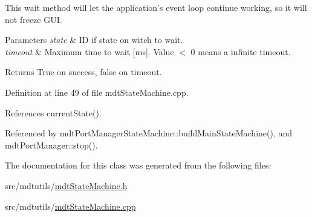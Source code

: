 This wait method will let the application's event loop continue working, so it will not freeze G\-U\-I.


\begin{DoxyParams}{Parameters}
{\em state} & I\-D if state on witch to wait. \\
\hline
{\em timeout} & Maximum time to wait \mbox{[}ms\mbox{]}. Value $<$ 0 means a infinite timeout. \\
\hline
\end{DoxyParams}
\begin{DoxyReturn}{Returns}
True on success, false on timeout. 
\end{DoxyReturn}


Definition at line 49 of file mdt\-State\-Machine.\-cpp.



References current\-State().



Referenced by mdt\-Port\-Manager\-State\-Machine\-::build\-Main\-State\-Machine(), and mdt\-Port\-Manager\-::stop().



The documentation for this class was generated from the following files\-:\begin{DoxyCompactItemize}
\item 
src/mdtutils/\hyperlink{mdt_state_machine_8h}{mdt\-State\-Machine.\-h}\item 
src/mdtutils/\hyperlink{mdt_state_machine_8cpp}{mdt\-State\-Machine.\-cpp}\end{DoxyCompactItemize}

